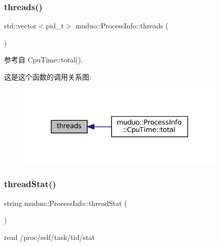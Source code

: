 \mbox{\label{namespacemuduo_1_1ProcessInfo_a360aafb2759971d7c8190b1a60f7dc03}} 
\subsubsection{\texorpdfstring{threads()}{threads()}}
{\footnotesize\ttfamily std\+::vector$<$pid\+\_\+t$>$ muduo\+::\+Process\+Info\+::threads (\begin{DoxyParamCaption}{ }\end{DoxyParamCaption})}



参考自 Cpu\+Time\+::total().

这是这个函数的调用关系图\+:
\nopagebreak
\begin{figure}[H]
\begin{center}
\leavevmode
\includegraphics[width=282pt]{namespacemuduo_1_1ProcessInfo_a360aafb2759971d7c8190b1a60f7dc03_icgraph}
\end{center}
\end{figure}
\mbox{\label{namespacemuduo_1_1ProcessInfo_a7d3faa2d63f4cf7b8ba073a3daf7ffb1}} 
\subsubsection{\texorpdfstring{thread\+Stat()}{threadStat()}}
{\footnotesize\ttfamily string muduo\+::\+Process\+Info\+::thread\+Stat (\begin{DoxyParamCaption}{ }\end{DoxyParamCaption})}



read /proc/self/task/tid/stat 

